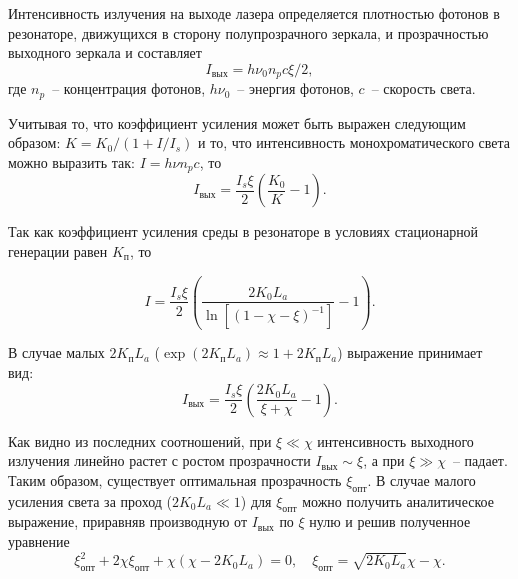 
Интенсивность излучения на выходе лазера определяется плотностью фотонов в
резонаторе, движущихся в сторону полупрозрачного зеркала, и прозрачностью
выходного зеркала и составляет
\[
  I_\text{вых} = h\nu_0 n_p c\xi / 2,
\]
где \( n_p \)~-- концентрация фотонов, \( h\nu_0 \)~-- энергия фотонов,
\( c \)~-- скорость света.

Учитывая то, что коэффициент усиления может быть выражен следующим образом:
\( K = K_0 / (1 + I / I_s) \) и то, что интенсивность монохроматического света
можно выразить так: \( I = h\nu n_p c \), то
\[
  I_\text{вых} = \frac{I_s \xi}{2} \left( \frac{K_0}{K} - 1 \right).
\]

Так как коэффициент усиления среды в резонаторе в условиях стационарной
генерации равен \( K_\text{п} \), то

\begin{equation}
  I = \frac{I_s \xi}{2} \left( \frac{2K_0 L_a}{\ln\left[ (1 - \chi - \xi)^{-1}
    \right]} - 1\right).
  \label{eq_1.91}
\end{equation}

В случае малых \( 2K_\text{п}L_a \)
(\( \exp(2K_\text{п}L_a) \approx 1 + 2K_\text{п}L_a \))
выражение принимает вид:
\[
  I_\text{вых} = \frac{I_s \xi}{2} \left( \frac{2K_0 L_a}{\xi + \chi} - 1
    \right).
\]

Как видно из последних соотношений, при \( \xi \ll \chi \) интенсивность
выходного излучения линейно растет с ростом прозрачности
\( I_\text{вых} \sim \xi \), а при \( \xi \gg \chi \)~-- падает. Таким образом,
существует оптимальная прозрачность \( \xi_\text{опт} \). В случае малого
усиления света за проход (\( 2K_0 L_a \ll 1 \)) для \( \xi_\text{опт} \) можно
получить аналитическое выражение, приравняв производную от \( I_\text{вых} \) по
\( \xi \) нулю и решив полученное уравнение
\[
  \xi_\text{опт}^2 + 2\chi\xi_\text{опт} + \chi(\chi - 2K_0 L_a) = 0, \quad
    \xi_\text{опт} = \sqrt{2K_0 L_a}\chi - \chi.
\]
